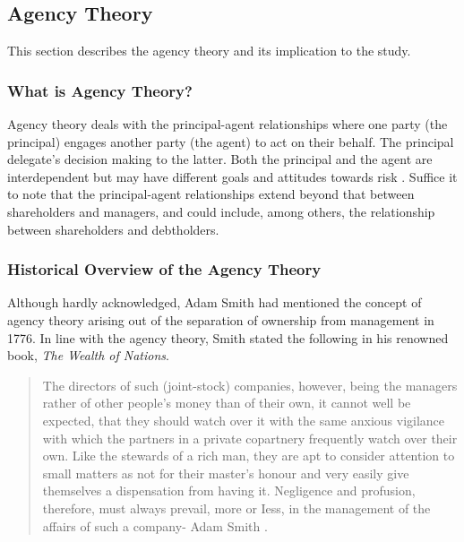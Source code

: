 \documentclass[a4paper,nobind]{templates/ociamthesis}
\begin{document}
\hypertarget{agency-theory}{%
\subsection{Agency Theory}\label{agency-theory}}

\noindent This section describes the agency theory and its implication to the study.

\hypertarget{what-is-agency-theory}{%
\subsubsection{What is Agency Theory?}\label{what-is-agency-theory}}

\noindent Agency theory deals with the principal-agent relationships where one party (the principal) engages another party (the agent) to act on their behalf. The principal delegate's decision making to the latter. Both the principal and the agent are interdependent but may have different goals and attitudes towards risk \autocite{ballwieser2012agency,eisenhardt1989agency}. Suffice it to note that the principal-agent relationships extend beyond that between shareholders and managers, and could include, among others, the relationship between shareholders and debtholders.

\hypertarget{historical-overview-of-the-agency-theory}{%
\subsubsection{Historical Overview of the Agency Theory}\label{historical-overview-of-the-agency-theory}}

\noindent Although hardly acknowledged, Adam Smith had mentioned the concept of agency theory arising out of the separation of ownership from management in 1776. In line with the agency theory, Smith stated the following in his renowned book, \emph{The Wealth of Nations}.

\begin{quote}
The directors of such (joint-stock) companies, however, being the managers rather of other people's money than of their own, it cannot well be expected, that they should watch over it with the same anxious vigilance with which the partners in a private copartnery frequently watch over their own. Like the stewards of a rich man, they are apt to consider attention to small matters as not for their master's honour and very easily give themselves a dispensation from having it. Negligence and profusion, therefore, must always prevail, more or Iess, in the management of the affairs of such a company- Adam Smith \autocite{jensen1976theory}.
\end{quote}
\end{document}
